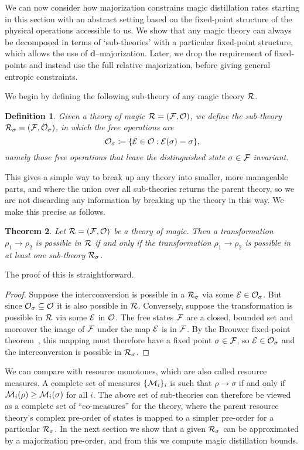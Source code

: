 \documentclass[
onecolumn,
superscriptaddress
]{revtex4-1}
\newtheorem{theorem}{Theorem}
\newtheorem{definition}[theorem]{Definition}
\def\d{\boldsymbol{d}}
\def\E{{\cal E}}
\def\R{{\cal R}}
\def\M{{\cal M}}
\def\F{{\cal F}}
\renewcommand{\O}{{\cal O}}
\begin{document}
We can now consider how majorization constrains magic distillation rates starting in this section with an abstract setting based on the fixed-point structure of the physical operations accessible to us. We show that any magic theory can always be decomposed in terms of `sub-theories' with a particular fixed-point structure, which allows the use of $\d$--majorization. 
Later, we drop the requirement of fixed-points and instead use the full relative majorization, before giving general entropic constraints.
 
 We begin by defining the following sub-theory of any magic theory $\R$.
\begin{definition}\label{def:sigmafrag}
   Given a theory of magic $\R = (\F, \O)$, we define the sub-theory $\R_\sigma = (\F, \O_\sigma)$, in which the free operations are 
   \begin{equation}
        \O_\sigma \coloneqq \{ \E \in \O: \E(\sigma) = \sigma \},
    \end{equation}
namely those free operations that leave the distinguished state $\sigma \in \F$ invariant.
\end{definition}
This gives a simple way to break up any theory into smaller, more manageable parts, and where the union over all sub-theories returns the parent theory, so we are not discarding any information by breaking up the theory in this way. We make this precise as follows.
\begin{theorem}\label{thm:frag}
    Let $\R = (\F, \O)$ be a theory of magic.
Then a transformation $\rho_1 \rightarrow \rho_2$ is possible in $\R$ if and only if the transformation $\rho_1 \rightarrow \rho_2$ is possible in at least one sub-theory $\R_\sigma$.
\end{theorem}
\noindent The proof of this is straightforward.
\begin{proof}
   Suppose the interconversion is possible in a $\R_\sigma$ via some $\E \in \O_\sigma$. But since $\O_\sigma \subseteq \O$ it is also possible in $\R$. Conversely, suppose the transformation is possible in $\R$ via some $\E$ in $\O$. The free states $\F$ are a closed, bounded set and moreover the image of $\F$ under the map $\E$ is in $\F$. By the Brouwer fixed-point theorem~\cite{cit:brouwer}, this mapping must therefore have a fixed point $\sigma \in \F$, so $\E \in \O_\sigma$ and the interconversion is possible in $\R_\sigma$.
\end{proof}
We can compare with resource monotones, which are also called resource measures. A complete set of measures $\{\M_i\}_i$ is such that $\rho \rightarrow \sigma$ if and only if $\M_i(\rho) \ge \M_i(\sigma)$ for all $i$. The above set of sub-theories can therefore be viewed as a complete set of ``co-measures'' for the theory, where the parent resource theory's complex pre-order of states is mapped to a simpler pre-order for a particular $\R_\sigma$. 
In the next section we show that a given $\R_\sigma$ can be approximated by a majorization pre-order, and from this we compute magic distillation bounds.
\end{document}
